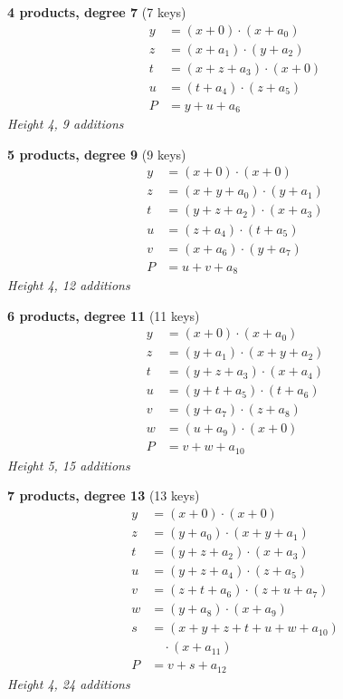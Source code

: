 \medskip
\noindent
\begin{minipage}[t]{0.47\textwidth}
\textbf{4 products, degree 7} (7 keys)
\[
\begin{aligned}
y &= (x + 0) \cdot (x + a_0) \\
z &= (x + a_1) \cdot (y + a_2) \\
t &= (x + z + a_3) \cdot (x + 0) \\
u &= (t + a_4) \cdot (z + a_5) \\
P &= y + u + a_6
\end{aligned}
\]
\emph{Height 4, 9 additions}
\end{minipage}
\hfill
\begin{minipage}[t]{0.47\textwidth}
\textbf{5 products, degree 9} (9 keys)
\[
\begin{aligned}
y &= (x + 0) \cdot (x + 0) \\
z &= (x + y + a_0) \cdot (y + a_1) \\
t &= (y + z + a_2) \cdot (x + a_3) \\
u &= (z + a_4) \cdot (t + a_5) \\
v &= (x + a_6) \cdot (y + a_7) \\
P &= u + v + a_8
\end{aligned}
\]
\emph{Height 4, 12 additions}
\end{minipage}

\medskip
\noindent
\begin{minipage}[t]{0.47\textwidth}
\textbf{6 products, degree 11} (11 keys)
\[
\begin{aligned}
y &= (x + 0) \cdot (x + a_0) \\
z &= (y + a_1) \cdot (x + y + a_2) \\
t &= (y + z + a_3) \cdot (x + a_4) \\
u &= (y + t + a_5) \cdot (t + a_6) \\
v &= (y + a_7) \cdot (z + a_8) \\
w &= (u + a_9) \cdot (x + 0) \\
P &= v + w + a_{10}
\end{aligned}
\]
\emph{Height 5, 15 additions}
\end{minipage}
\hfill
\begin{minipage}[t]{0.47\textwidth}
\textbf{7 products, degree 13} (13 keys)
\[
\begin{aligned}
y &= (x + 0) \cdot (x + 0) \\
z &= (y + a_0) \cdot (x + y + a_1) \\
t &= (y + z + a_2) \cdot (x + a_3) \\
u &= (y + z + a_4) \cdot (z + a_5) \\
v &= (z + t + a_6) \cdot (z + u + a_7) \\
w &= (y + a_8) \cdot (x + a_9) \\
s &= (x + y + z + t + u + w + a_{10}) \\
  &\quad\cdot(x + a_{11}) \\
P &= v + s + a_{12}
\end{aligned}
\]
\emph{Height 4, 24 additions}
\end{minipage}

